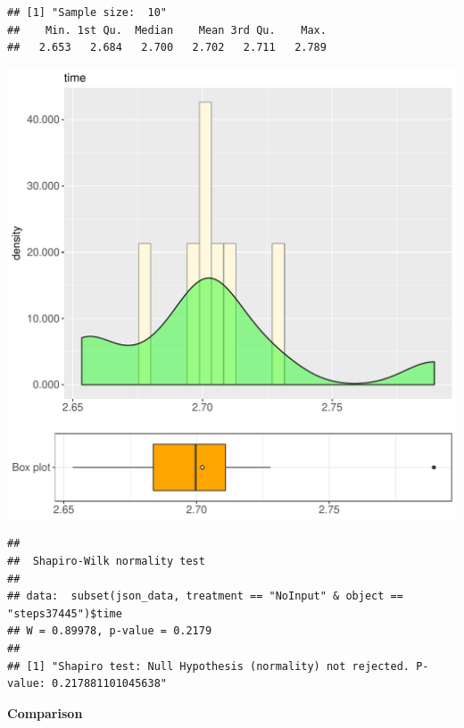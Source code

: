 \documentclass{article}\usepackage[]{graphicx}\usepackage[]{color}
\makeatletter
\def\maxwidth{ %
  \ifdim\Gin@nat@width>\linewidth
    \linewidth
  \else
    \Gin@nat@width
  \fi
}
\newenvironment{kframe}{%
 \def\at@end@of@kframe{}%
 \ifinner\ifhmode%
  \def\at@end@of@kframe{\end{minipage}}%
  \begin{minipage}{\columnwidth}%
 \fi\fi%
 \def\FrameCommand##1{\hskip\@totalleftmargin \hskip-\fboxsep
 \colorbox{shadecolor}{##1}\hskip-\fboxsep
     \hskip-\linewidth \hskip-\@totalleftmargin \hskip\columnwidth}%
 \MakeFramed {\advance\hsize-\width
   \@totalleftmargin\z@ \linewidth\hsize
   \@setminipage}}%
 {\par\unskip\endMakeFramed%
 \at@end@of@kframe}
\newenvironment{knitrout}{}{} %
\makeatother
\begin{document}
\begin{knitrout}
\color{fgcolor}\begin{kframe}
\begin{verbatim}
## [1] "Sample size:  10"
##    Min. 1st Qu.  Median    Mean 3rd Qu.    Max. 
##   2.653   2.684   2.700   2.702   2.711   2.789
\end{verbatim}
\end{kframe}
\includegraphics[width=\maxwidth]{figure/RH4_NoInput_steps37445-1} 
\begin{kframe}\begin{verbatim}
## 
## 	Shapiro-Wilk normality test
## 
## data:  subset(json_data, treatment == "NoInput" & object == "steps37445")$time
## W = 0.89978, p-value = 0.2179
## 
## [1] "Shapiro test: Null Hypothesis (normality) not rejected. P-value: 0.217881101045638"
\end{verbatim}
\end{kframe}
\end{knitrout}
  
 \textbf{Comparison}
  
\end{document}
